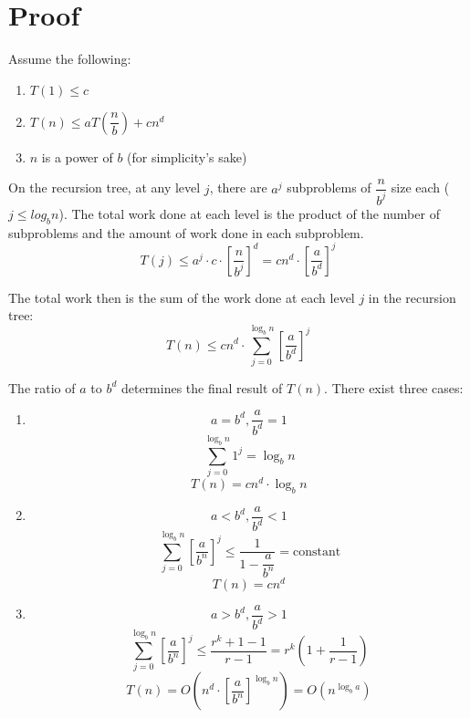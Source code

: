 \documentclass[11pt]{article}
\begin{document}
\section{Proof}
	Assume the following:
	\begin{enumerate}
		\item $T(1)\leq c$
		\item $T(n)\leq aT\left(\dfrac{n}{b}\right) + cn^d$
		\item $n$ is a power of $b$ (for simplicity's sake)
	\end{enumerate}
	
	On the recursion tree, at any level $j$, there are $a^j$ subproblems of $\dfrac{n}{b^j}$ size each ($j\leq log_b n$). The total work done at each level is the product of the number of subproblems and the amount of work done in each subproblem.
	\begin{equation}
		T(j)\leq a^j\cdot c\cdot\left[\frac{n}{b^j}\right]^d = cn^d\cdot\left[\frac{a}{b^d}\right]^j
	\end{equation}
	
	The total work then is the sum of the work done at each level $j$ in the recursion tree:
	\begin{equation}
		T(n)\leq cn^d\cdot \sum_{j=0}^{\log_b n}\left[\frac{a}{b^d}\right]^j
	\end{equation}
	
	The ratio of $a$ to $b^d$ determines the final result of $T(n)$. There exist three cases:
	
	\begin{enumerate}
		\item
			\[a=b^d, \frac{a}{b^d} = 1\]
			\[\sum_{j=0}^{\log_b n}1^j = \log_b n\]
			\begin{equation}
				T(n) = cn^d\cdot\log_b n
			\end{equation}
		\item
			\[a<b^d, \frac{a}{b^d}<1\]
			\[\sum_{j=0}^{\log_b n}\left[\frac{a}{b^n}\right]^j \leq \dfrac{1}{1 - \dfrac{a}{b^n}} = \text{constant}\]
			\begin{equation}
				T(n) = cn^d
			\end{equation}
		\item
			\[a>b^d, \frac{a}{b^d} > 1\]
			\[\sum_{j=0}^{\log_b n}\left[\frac{a}{b^n}\right]^j \leq \frac{r^k+1 -1}{r-1} = r^k\left(1 + \frac{1}{r-1}\right)\]
			\begin{equation}
				T(n)=O\left(n^d\cdot\left[\frac{a}{b^n}\right]^{\log_b n}\right) = O(n^{\log_b a})
			\end{equation}
	\end{enumerate}
\end{document}
